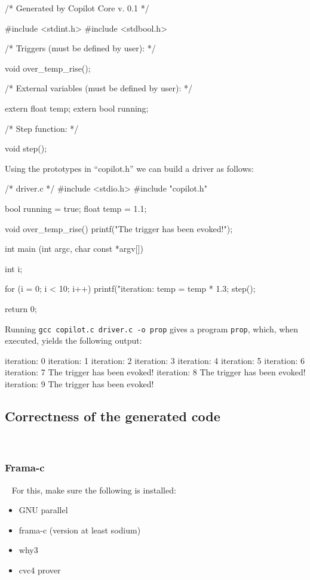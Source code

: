 \begin{code}
/* Generated by Copilot Core v. 0.1 */

#include <stdint.h>
#include <stdbool.h>

/* Triggers (must be defined by user): */

void over_temp_rise();

/* External variables (must be defined by user): */

extern float temp;
extern bool running;

/* Step function: */

void step();
\end{code}

Using the prototypes in ``copilot.h'' we can build a driver as follows:

\begin{code}
/* driver.c */
#include <stdio.h>
#include "copilot.h"

bool running = true;
float temp = 1.1;

void over_temp_rise()
{
  printf("The trigger has been evoked!\n");
}

int main (int argc, char const *argv[])
{
  int i;

  for (i = 0; i < 10; i++)
  {
    printf("iteration: %
    temp = temp * 1.3;
    step();
  }

  return 0;
}
\end{code}

Running {\tt gcc copilot.c driver.c -o prop} gives a program {\tt prop}, which,
when executed, yields the following output:
%
\begin{code}
iteration: 0
iteration: 1
iteration: 2
iteration: 3
iteration: 4
iteration: 5
iteration: 6
iteration: 7
The trigger has been evoked!
iteration: 8
The trigger has been evoked!
iteration: 9
The trigger has been evoked!
\end{code}
%

\subsection{Correctness of the generated code}~\label{sec:correctness}

\subsubsection{Frama-c}~\label{subsec:frama-c}
For this, make sure the following is installed:

\begin{itemize}
	\item GNU parallel
	\item frama-c (version at least sodium)
	\item why3
	\item cvc4 prover
\end{itemize}

